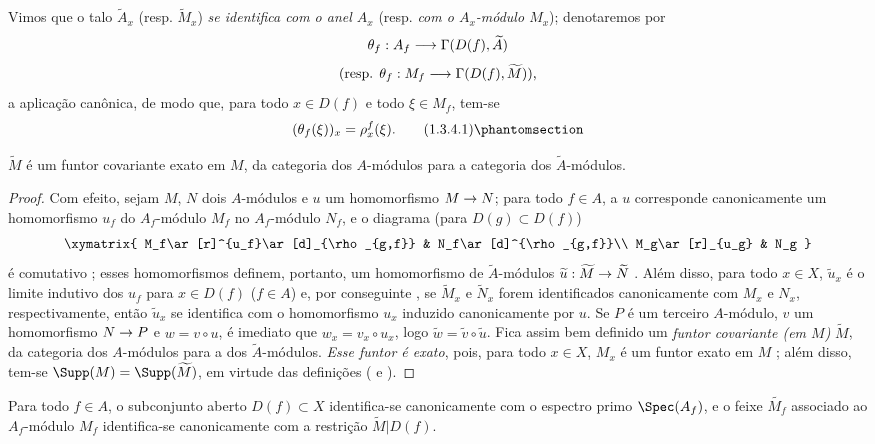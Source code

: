 \documentclass[oneside]{amsart}
\makeatletter
\newcommand{\ega@arrow}[2]{\mathchoice{#1}{#2}{#2}{#2}}
\renewcommand{\to}{\ega@arrow{\longrightarrow}{\rightarrow}}
\newcommand{\oldpage}[2][]{{\marginnote{\normalfont\textbf{#1}~|~#2}}\ignorespaces}
\let\EGAOriginalLabel\label
\renewcommand{\label}[1]{\phantomsection\EGAOriginalLabel{#1}}
\makeatother
\begin{document}
Vimos  que o talo $\widetilde{A}_x$ (resp. $\widetilde{M}_x$) \emph{se identifica com o anel $A_x$} (resp. \emph{com o $A_x$-módulo $M_x$});
denotaremos por
\[
  \theta_f:A_f\to\Gamma(D(f),\widetilde{A})
\]
\[
  \text{(resp. }\theta_f:M_f\to\Gamma(D(f),\widetilde{M})\text{),}
\]
a aplicação canônica, de modo que, para todo $x\in D(f)$ e todo $\xi\in M_f$, tem-se
\[
  (\theta_f(\xi))_x=\rho_x^f(\xi).
  \tag{1.3.4.1}
  \label{I.1.3.4.1}
\]

\begin{proposition}[1.3.5]
\label{I.1.3.5}
$\widetilde{M}$ é um funtor covariante exato em $M$, da categoria dos $A$-módulos para a categoria dos $\widetilde{A}$-módulos.
\end{proposition}

\begin{proof}
Com efeito, sejam $M$, $N$ dois $A$-módulos e $u$ um homomorfismo $M\to N$;
para todo $f\in A$, a $u$ corresponde canonicamente um homomorfismo $u_f$ do $A_f$-módulo $M_f$ no $A_f$-módulo $N_f$, e o diagrama (para $D(g)\subset D(f)$)
\[
  \xymatrix{
    M_f\ar[r]^{u_f}\ar[d]_{\rho_{g,f}} & N_f\ar[d]^{\rho_{g,f}}\\
    M_g\ar[r]_{u_g} & N_g
  }
\]
é comutativo ;
esses homomorfismos definem, portanto, um homomorfismo de $\widetilde{A}$-módulos $\widetilde{u}:\widetilde{M}\to\widetilde{N}$ .
Além disso, para todo $x\in X$, $\widetilde{u}_x$ é o limite indutivo dos $u_f$ para $x\in D(f)$ ($f\in A$) e, por conseguinte , se $\widetilde{M}_x$ e $\widetilde{N}_x$ forem identificados canonicamente com $M_x$ e $N_x$, respectivamente, então $\widetilde{u}_x$ se identifica com o homomorfismo $u_x$ induzido canonicamente por $u$.
Se $P$ é um terceiro $A$-módulo, $v$ um homomorfismo $N\to P$ e $w=v\circ u$, é imediato que $w_x=v_x\circ u_x$, logo $\widetilde{w}=\widetilde{v}\circ\widetilde{u}$.
Fica assim bem definido um \emph{funtor covariante (em $M$)} $\widetilde{M}$, da categoria dos $A$-módulos para a dos $\widetilde{A}$-módulos.
\emph{Esse funtor é exato}, pois, para todo $x\in X$, $M_x$ é um funtor exato em $M$ ;
além disso, tem-se $\Supp(M)=\Supp(\widetilde{M})$, em virtude das definições ( e ).
\end{proof}

\oldpage[I]{86}
\begin{proposition}[1.3.6]
\label{I.1.3.6}
Para todo $f\in A$, o subconjunto aberto $D(f)\subset X$ identifica-se canonicamente com o espectro primo $\Spec(A_f)$, e o feixe $\widetilde{M_f}$ associado ao $A_f$-módulo $M_f$ identifica-se canonicamente com a restrição $\widetilde{M}|D(f)$.
\end{proposition}
\end{document}
